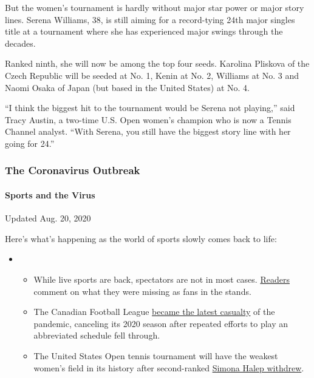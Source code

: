 But the women's tournament is hardly without major star power or major
story lines. Serena Williams, 38, is still aiming for a record-tying
24th major singles title at a tournament where she has experienced major
swings through the decades.

Ranked ninth, she will now be among the top four seeds. Karolina
Pliskova of the Czech Republic will be seeded at No. 1, Kenin at No. 2,
Williams at No. 3 and Naomi Osaka of Japan (but based in the United
States) at No. 4.

``I think the biggest hit to the tournament would be Serena not
playing,'' said Tracy Austin, a two-time U.S. Open women's champion who
is now a Tennis Channel analyst. ``With Serena, you still have the
biggest story line with her going for 24.''

\hypertarget{the-coronavirus-outbreak}{%
\subsubsection{The Coronavirus
Outbreak}\label{the-coronavirus-outbreak}}

\hypertarget{sports-and-the-virus}{%
\paragraph{Sports and the Virus}\label{sports-and-the-virus}}

Updated Aug. 20, 2020

Here's what's happening as the world of sports slowly comes back to
life:

\begin{itemize}
\item
  \begin{itemize}
  \tightlist
  \item
    While live sports are back, spectators are not in most cases.
    \href{https://www.nytimes3xbfgragh.onion/2020/08/19/sports/empty-stadiums-live-fans.html?action=click\&pgtype=Article\&state=default\&region=MAIN_CONTENT_2\&context=storylines_keepup}{Readers}
    comment on what they were missing as fans in the stands.
  \item
    The Canadian Football League
    \href{https://www.nytimes3xbfgragh.onion/2020/08/18/sports/cfl-season-canceled.html?action=click\&pgtype=Article\&state=default\&region=MAIN_CONTENT_2\&context=storylines_keepup}{became
    the latest casualty} of the pandemic, canceling its 2020 season
    after repeated efforts to play an abbreviated schedule fell through.
  \item
    The United States Open tennis tournament will have the weakest
    women's field in its history after second-ranked
    \href{https://www.nytimes3xbfgragh.onion/2020/08/17/sports/tennis/us-open-women.html?action=click\&pgtype=Article\&state=default\&region=MAIN_CONTENT_2\&context=storylines_keepup}{Simona
    Halep withdrew}.
  \end{itemize}
\end{itemize}


